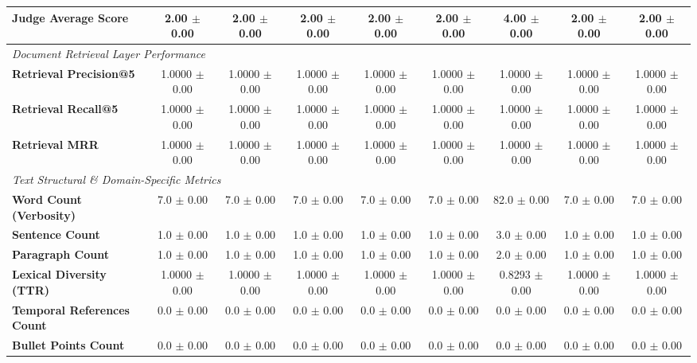 \begin{table}[t]
\begin{tabular}{lcccccccc}
\textbf{Judge Average Score} & 2.00 $\pm$ 0.00 & 2.00 $\pm$ 0.00 & 2.00 $\pm$ 0.00 & 2.00 $\pm$ 0.00 & 2.00 $\pm$ 0.00 & 4.00 $\pm$ 0.00 & 2.00 $\pm$ 0.00 & 2.00 $\pm$ 0.00 \\
\midrule
\multicolumn{9}{l}{\textit{Document Retrieval Layer Performance}} \\
\textbf{Retrieval Precision@5} & 1.0000 $\pm$ 0.00 & 1.0000 $\pm$ 0.00 & 1.0000 $\pm$ 0.00 & 1.0000 $\pm$ 0.00 & 1.0000 $\pm$ 0.00 & 1.0000 $\pm$ 0.00 & 1.0000 $\pm$ 0.00 & 1.0000 $\pm$ 0.00 \\
\textbf{Retrieval Recall@5} & 1.0000 $\pm$ 0.00 & 1.0000 $\pm$ 0.00 & 1.0000 $\pm$ 0.00 & 1.0000 $\pm$ 0.00 & 1.0000 $\pm$ 0.00 & 1.0000 $\pm$ 0.00 & 1.0000 $\pm$ 0.00 & 1.0000 $\pm$ 0.00 \\
\textbf{Retrieval MRR} & 1.0000 $\pm$ 0.00 & 1.0000 $\pm$ 0.00 & 1.0000 $\pm$ 0.00 & 1.0000 $\pm$ 0.00 & 1.0000 $\pm$ 0.00 & 1.0000 $\pm$ 0.00 & 1.0000 $\pm$ 0.00 & 1.0000 $\pm$ 0.00 \\
\midrule
\multicolumn{9}{l}{\textit{Text Structural \& Domain-Specific Metrics}} \\
\textbf{Word Count (Verbosity)} & 7.0 $\pm$ 0.00 & 7.0 $\pm$ 0.00 & 7.0 $\pm$ 0.00 & 7.0 $\pm$ 0.00 & 7.0 $\pm$ 0.00 & 82.0 $\pm$ 0.00 & 7.0 $\pm$ 0.00 & 7.0 $\pm$ 0.00 \\
\textbf{Sentence Count} & 1.0 $\pm$ 0.00 & 1.0 $\pm$ 0.00 & 1.0 $\pm$ 0.00 & 1.0 $\pm$ 0.00 & 1.0 $\pm$ 0.00 & 3.0 $\pm$ 0.00 & 1.0 $\pm$ 0.00 & 1.0 $\pm$ 0.00 \\
\textbf{Paragraph Count} & 1.0 $\pm$ 0.00 & 1.0 $\pm$ 0.00 & 1.0 $\pm$ 0.00 & 1.0 $\pm$ 0.00 & 1.0 $\pm$ 0.00 & 2.0 $\pm$ 0.00 & 1.0 $\pm$ 0.00 & 1.0 $\pm$ 0.00 \\
\textbf{Lexical Diversity (TTR)} & 1.0000 $\pm$ 0.00 & 1.0000 $\pm$ 0.00 & 1.0000 $\pm$ 0.00 & 1.0000 $\pm$ 0.00 & 1.0000 $\pm$ 0.00 & 0.8293 $\pm$ 0.00 & 1.0000 $\pm$ 0.00 & 1.0000 $\pm$ 0.00 \\
\textbf{Temporal References Count} & 0.0 $\pm$ 0.00 & 0.0 $\pm$ 0.00 & 0.0 $\pm$ 0.00 & 0.0 $\pm$ 0.00 & 0.0 $\pm$ 0.00 & 0.0 $\pm$ 0.00 & 0.0 $\pm$ 0.00 & 0.0 $\pm$ 0.00 \\
\textbf{Bullet Points Count} & 0.0 $\pm$ 0.00 & 0.0 $\pm$ 0.00 & 0.0 $\pm$ 0.00 & 0.0 $\pm$ 0.00 & 0.0 $\pm$ 0.00 & 0.0 $\pm$ 0.00 & 0.0 $\pm$ 0.00 & 0.0 $\pm$ 0.00 \\
\bottomrule
\end{tabular}
\end{table}